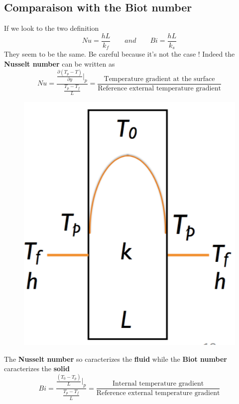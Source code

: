 	\subsection{Comparaison with the Biot number}
		If we look to the two definition 
		\begin{equation}
			Nu = \frac{hL}{k_f} \qquad and \qquad Bi = \frac{hL}{k_s}
		\end{equation}
		They seem to be the same. Be careful because it's not the case ! Indeed the \textbf{Nusselt number} can be written as 
		\begin{equation}
			Nu = \frac{\frac{\partial (T_p - T)}{\partial y}|_p}{\frac{T_p-T_f}{L}} = \frac{\mbox{Temperature gradient at the surface}}{\mbox{Reference external temperature gradient}}
		\end{equation}
		
		\begin{figure}
		\vspace{-5 mm}
		\includegraphics[scale=0.25]{ch5/4}
		\end{figure}			
		The \textbf{Nusselt number} so caracterizes the \textbf{fluid} while the \textbf{Biot number} caracterizes the \textbf{solid}
		\begin{equation}
			Bi = \frac{\frac{(T_0 - T_p)}{L}|_p}{\frac{T_p-T_f}{L}} = \frac{\mbox{Internal temperature gradient}}{\mbox{Reference external temperature gradient}}
		\end{equation}
	
